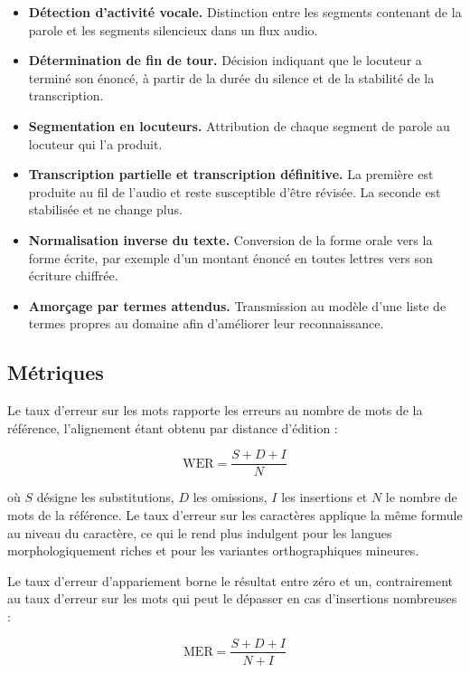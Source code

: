 \begin{itemize}
  \item \textbf{Détection d'activité vocale.} Distinction entre les segments contenant de la parole et les segments silencieux dans un flux audio.
  \item \textbf{Détermination de fin de tour.} Décision indiquant que le locuteur a terminé son énoncé, à partir de la durée du silence et de la stabilité de la transcription.
  \item \textbf{Segmentation en locuteurs.} Attribution de chaque segment de parole au locuteur qui l'a produit.
  \item \textbf{Transcription partielle et transcription définitive.} La première est produite au fil de l'audio et reste susceptible d'être révisée. La seconde est stabilisée et ne change plus.
  \item \textbf{Normalisation inverse du texte.} Conversion de la forme orale vers la forme écrite, par exemple d'un montant énoncé en toutes lettres vers son écriture chiffrée.
  \item \textbf{Amorçage par termes attendus.} Transmission au modèle d'une liste de termes propres au domaine afin d'améliorer leur reconnaissance.
\end{itemize}

\subsection*{Métriques}

Le taux d'erreur sur les mots rapporte les erreurs au nombre de mots de la référence, l'alignement étant obtenu par distance d'édition :

\begin{equation}
\mathrm{WER} = \frac{S + D + I}{N}
\end{equation}

où $S$ désigne les substitutions, $D$ les omissions, $I$ les insertions et $N$ le nombre de mots de la référence. Le taux d'erreur sur les caractères applique la même formule au niveau du caractère, ce qui le rend plus indulgent pour les langues morphologiquement riches et pour les variantes orthographiques mineures.

Le taux d'erreur d'appariement borne le résultat entre zéro et un, contrairement au taux d'erreur sur les mots qui peut le dépasser en cas d'insertions nombreuses :

\begin{equation}
\mathrm{MER} = \frac{S + D + I}{N + I}
\end{equation}

